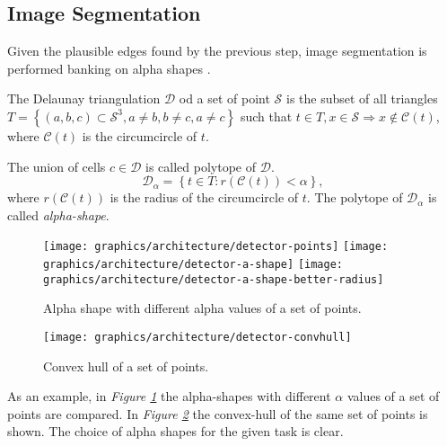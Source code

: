     \subsection{Image Segmentation}\label{subsection:segmentation}
        \par{
            Given the plausible edges found by the previous step, image segmentation is performed banking on alpha shapes \cite{springer:10.1007/11907350_46}.
        }
        \par{
            The Delaunay triangulation $\mathcal{D}$ od a set of point $\mathcal{S}$ is the subset of all triangles $T = \left\{\left(a, b, c\right) \subset \mathcal{S}^3, a \neq b, b \neq c, a \neq c \right\}$ such that $t \in T, x \in \mathcal{S} \Rightarrow x \not\in \mathcal{C}\left(t\right)$, where $\mathcal{C}\left(t\right)$ is the circumcircle of $t$.
        }
        \par{
            The union of cells $c \in \mathcal{D}$ is called polytope of $\mathcal{D}$. 
            \begin{equation*}
                \mathcal{D}_\alpha = \left\{t \in T \colon r\left(\mathcal{C}\left(t\right)\right) < \alpha\right\},
            \end{equation*}
            where $r\left(\mathcal{C}\left(t\right)\right)$ is the radius of the circumcircle of $t$. The polytope of $\mathcal{D}_\alpha$ is called \emph{alpha-shape}.
        }
        \begin{figure}
            \centering
            \texttt{[image: graphics/architecture/detector-points]}
            \texttt{[image: graphics/architecture/detector-a-shape]}
            \texttt{[image: graphics/architecture/detector-a-shape-better-radius]}
            \caption{Alpha shape with different alpha values of a set of points.}\label{fig:example-alpha-shape}
        \end{figure}
        \begin{figure}
            \centering
            \texttt{[image: graphics/architecture/detector-convhull]}
            \caption{Convex hull of a set of points.}\label{fig:example-convex-hull}
        \end{figure}
        \par{
            As an example, in \emph{Figure \ref{fig:example-alpha-shape}} the alpha-shapes with different $\alpha$ values of a set of points are compared. In \emph{Figure \ref{fig:example-convex-hull}} the convex-hull of the same set of points is shown. The choice of alpha shapes for the given task is clear.
        }
